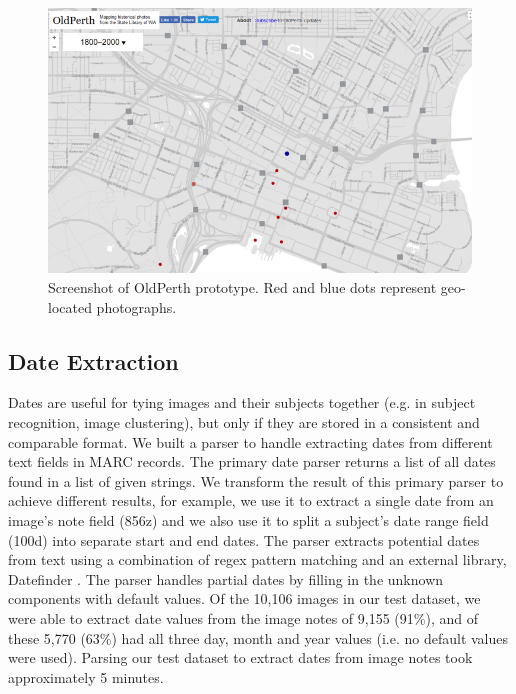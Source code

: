 \documentclass[10pt, a4paper]{article}
\begin{document}
\begin{figure}[ht]
  \centering
  \includegraphics[width=\columnwidth]{figures/oldperth.png}
  \caption{Screenshot of OldPerth prototype. Red and blue dots represent geo-located photographs.}
  \label{figure:oldperth}
\end{figure}

\subsection{Date Extraction}
\label{subsection:metadata_parsing:date_extraction}
Dates are useful for tying images and their subjects together (e.g. in subject recognition, image clustering), but only if they are stored in a consistent and comparable format. We built a parser to handle extracting dates from different text fields in MARC records. The primary date parser returns a list of all dates found in a list of given strings. We transform the result of this primary parser to achieve different results, for example, we use it to extract a single date from an image's note field (856z) and we also use it to split a subject's date range field (100d) into separate start and end dates. The parser extracts potential dates from text using a combination of regex pattern matching and an external library, Datefinder \cite{datefinder}. The parser handles partial dates by filling in the unknown components with default values. Of the 10,106 images in our test dataset, we were able to extract date values from the image notes of 9,155 (91\%), and of these 5,770 (63\%) had all three day, month and year values (i.e. no default values were used). Parsing our test dataset to extract dates from image notes took approximately 5 minutes.
\end{document}
